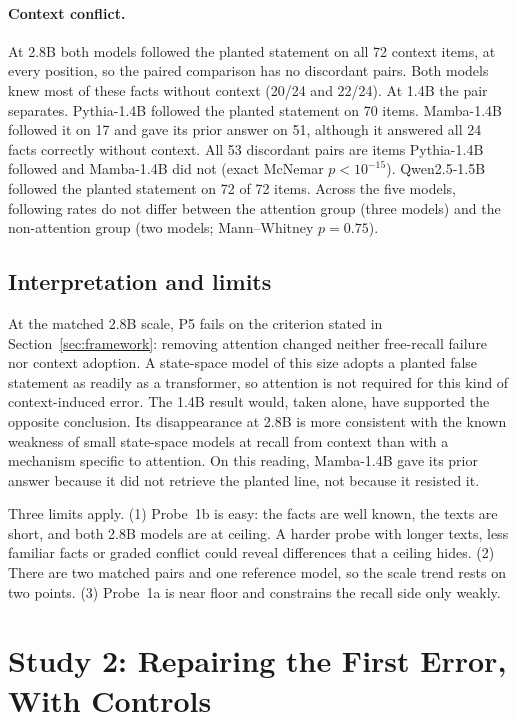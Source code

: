 \documentclass[10pt]{article}
\begin{document}
\paragraph{Context conflict.} At 2.8B both models followed the planted statement on all 72 context items, at every position, so the paired comparison has no discordant pairs. Both models knew most of these facts without context (20/24 and 22/24). At 1.4B the pair separates. Pythia-1.4B followed the planted statement on 70 items. Mamba-1.4B followed it on 17 and gave its prior answer on 51, although it answered all 24 facts correctly without context. All 53 discordant pairs are items Pythia-1.4B followed and Mamba-1.4B did not (exact McNemar $p<10^{-15}$). Qwen2.5-1.5B followed the planted statement on 72 of 72 items. Across the five models, following rates do not differ between the attention group (three models) and the non-attention group (two models; Mann--Whitney $p=0.75$).

\subsection{Interpretation and limits}
\label{sec:s1-limits}

At the matched 2.8B scale, P5 fails on the criterion stated in Section~\ref{sec:framework}: removing attention changed neither free-recall failure nor context adoption. A state-space model of this size adopts a planted false statement as readily as a transformer, so attention is not required for this kind of context-induced error. The 1.4B result would, taken alone, have supported the opposite conclusion. Its disappearance at 2.8B is more consistent with the known weakness of small state-space models at recall from context \citep{arora2024zoology,jelassi2024repeat} than with a mechanism specific to attention. On this reading, Mamba-1.4B gave its prior answer because it did not retrieve the planted line, not because it resisted it.

Three limits apply. (1) Probe~1b is easy: the facts are well known, the texts are short, and both 2.8B models are at ceiling. A harder probe with longer texts, less familiar facts or graded conflict could reveal differences that a ceiling hides. (2) There are two matched pairs and one reference model, so the scale trend rests on two points. (3) Probe~1a is near floor and constrains the recall side only weakly.

\section{Study 2: Repairing the First Error, With Controls}
\label{sec:study2}
\end{document}
